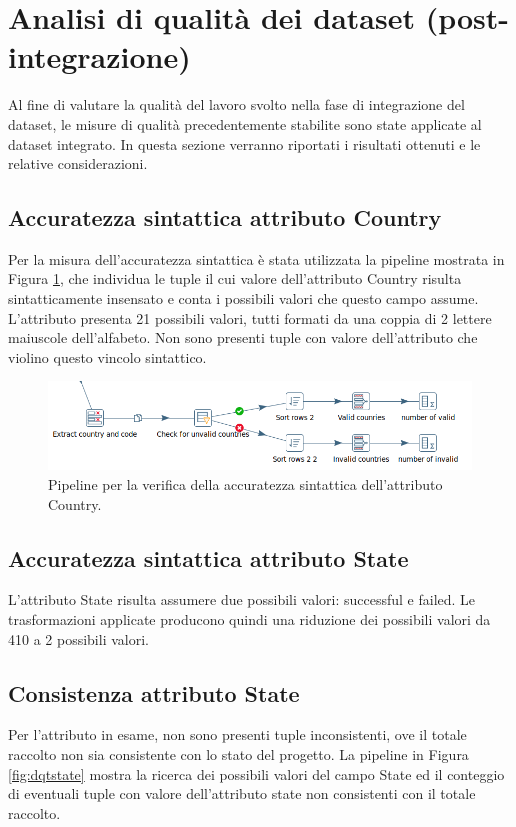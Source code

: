 \newpage
\section{Analisi di qualità dei dataset (post-integrazione)}
Al fine di valutare la qualità del lavoro svolto nella fase di integrazione del dataset, le misure di qualità precedentemente stabilite sono state applicate al dataset integrato. In questa sezione verranno riportati i risultati ottenuti e le relative considerazioni.

\subsection{Accuratezza sintattica attributo Country}
Per la misura dell'accuratezza sintattica è stata utilizzata la pipeline mostrata in Figura \ref{fig:dqtcountries}, che individua le tuple il cui valore dell'attributo Country risulta sintatticamente insensato e conta i possibili valori che questo campo assume.\\
L'attributo presenta 21 possibili valori, tutti formati da una coppia di 2 lettere maiuscole dell'alfabeto. Non sono presenti tuple con valore dell'attributo che violino questo vincolo sintattico.

\begin{figure}[h!]
	\centering
	\includegraphics[width=1\linewidth]{images/DQT_countries}
	\caption{Pipeline per la verifica della accuratezza sintattica dell'attributo Country.}
	\label{fig:dqtcountries}
\end{figure}


\subsection{Accuratezza sintattica attributo State}
L'attributo State risulta assumere due possibili valori: successful e failed. Le trasformazioni applicate producono quindi una riduzione dei possibili valori da 410 a 2 possibili valori.

\subsection{Consistenza attributo State}
Per l'attributo in esame, non sono presenti tuple inconsistenti, ove il totale raccolto non sia consistente con lo stato del progetto. La pipeline in Figura \ref{fig:dqtstate} mostra la ricerca dei possibili valori del campo State ed il conteggio di eventuali tuple con valore dell'attributo state non consistenti con il totale raccolto.

